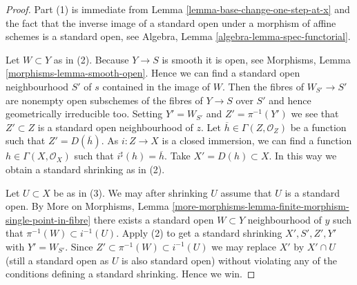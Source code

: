 \begin{proof}
Part (1) is immediate from
Lemma \ref{lemma-base-change-one-step-at-x}
and the fact that the inverse image of a standard open under a morphism
of affine schemes is a standard open, see
Algebra, Lemma \ref{algebra-lemma-spec-functorial}.

\medskip\noindent
Let $W \subset Y$ as in (2). Because $Y \to S$ is smooth it is open, see
Morphisms, Lemma \ref{morphisms-lemma-smooth-open}.
Hence we can find a standard open neighbourhood $S'$ of $s$
contained in the image of $W$. Then the fibres of $W_{S'} \to S'$
are nonempty open subschemes of the fibres of $Y \to S$ over $S'$
and hence geometrically irreducible too. Setting $Y' = W_{S'}$
and $Z' = \pi^{-1}(Y')$ we see that $Z' \subset Z$ is a standard open
neighbourhood of $z$. Let $\overline{h} \in \Gamma(Z, \mathcal{O}_Z)$
be a function such that $Z' = D(\overline{h})$. As $i : Z \to X$
is a closed immersion, we can find a function $h \in \Gamma(X, \mathcal{O}_X)$
such that $i^\sharp(h) = \overline{h}$. Take $X' = D(h) \subset X$.
In this way we obtain a standard shrinking as in (2).

\medskip\noindent
Let $U \subset X$ be as in (3). We may after shrinking $U$ assume that
$U$ is a standard open. By
More on Morphisms,
Lemma \ref{more-morphisms-lemma-finite-morphism-single-point-in-fibre}
there exists a standard open $W \subset Y$ neighbourhood of $y$ such
that $\pi^{-1}(W) \subset i^{-1}(U)$. Apply (2) to get a standard
shrinking $X', S', Z', Y'$ with $Y' = W_{S'}$. Since
$Z' \subset \pi^{-1}(W) \subset i^{-1}(U)$ we may replace $X'$ by
$X' \cap U$ (still a standard open as $U$ is also standard open)
without violating any of the conditions defining a standard shrinking.
Hence we win.
\end{proof}

